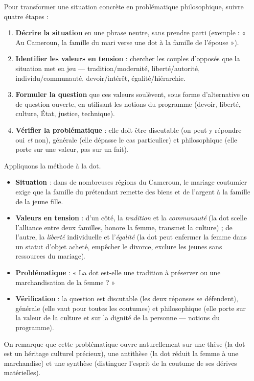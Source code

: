 \documentclass[11pt]{article}
\newcommand{\cle}[1]{{\popxbold\color{popdark}#1}}
\begin{document}
\begin{methode}
Pour transformer une situation concrète en problématique philosophique, suivre quatre étapes :
\begin{enumerate}
\item \textbf{Décrire la situation} en une phrase neutre, sans prendre parti (exemple : « Au Cameroun, la famille du mari verse une dot à la famille de l'épouse »).
\item \textbf{Identifier les valeurs en tension} : chercher les couples d'opposés que la situation met en jeu — \cle{tradition/modernité}, \cle{liberté/autorité}, \cle{individu/communauté}, \cle{devoir/intérêt}, \cle{égalité/hiérarchie}.
\item \textbf{Formuler la question} que ces valeurs soulèvent, sous forme d'alternative ou de question ouverte, en utilisant les notions du programme (devoir, liberté, culture, État, justice, technique).
\item \textbf{Vérifier la problématique} : elle doit être discutable (on peut y répondre oui \emph{et} non), générale (elle dépasse le cas particulier) et philosophique (elle porte sur une valeur, pas sur un fait).
\end{enumerate}
\end{methode}

\begin{exemplebox}
Appliquons la méthode à la dot.
\begin{itemize}
\item \textbf{Situation} : dans de nombreuses régions du Cameroun, le mariage coutumier exige que la famille du prétendant remette des biens et de l'argent à la famille de la jeune fille.
\item \textbf{Valeurs en tension} : d'un côté, la \emph{tradition} et la \emph{communauté} (la dot scelle l'alliance entre deux familles, honore la femme, transmet la culture) ; de l'autre, la \emph{liberté} individuelle et l'\emph{égalité} (la dot peut enfermer la femme dans un statut d'objet acheté, empêcher le divorce, exclure les jeunes sans ressources du mariage).
\item \textbf{Problématique} : « La dot est-elle une tradition à préserver ou une marchandisation de la femme ? »
\item \textbf{Vérification} : la question est discutable (les deux réponses se défendent), générale (elle vaut pour toutes les coutumes) et philosophique (elle porte sur la valeur de la culture et sur la dignité de la personne — notions du programme).
\end{itemize}
On remarque que cette problématique ouvre naturellement sur une thèse (la dot est un héritage culturel précieux), une antithèse (la dot réduit la femme à une marchandise) et une synthèse (distinguer l'esprit de la coutume de ses dérives matérielles).
\end{exemplebox}
\end{document}
